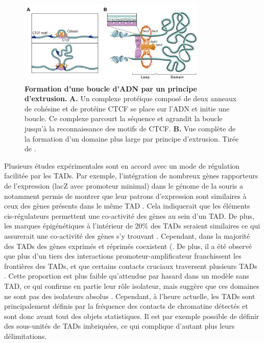 \begin{figure}[H]
    \centering
    \includegraphics[width=0.8\textwidth, page=1] {figures/introduction/fig13.png}
    \caption[Formation d'une boucle d'\acrshort{ADN} par un principe d'extrusion.]{
    \textbf{Formation d'une boucle d'\acrshort{ADN} par un principe d'extrusion.}
    \textbf{A.} Un complexe protéique composé de deux anneaux de cohésine et de protéine CTCF se place sur l'ADN et initie une boucle. Ce complexe parcourt la séquence et agrandit la boucle jusqu'à la reconnaissance des motifs de CTCF. \textbf{B.} Vue complète de la formation d'un domaine plus large par principe d'extrusion. Tirée de \citep{sanborn_chromatin_2015}.\\
    }
    \label{fig:Fig13}
\end{figure}

Plusieurs études expérimentales sont en accord avec un mode de régulation facilitée par les \acrshort{TAD}s. Par exemple, l’intégration de nombreux gènes rapporteurs de l’expression (lacZ avec promoteur minimal) dans le génome de la souris a notamment permis de montrer que leur patrons d’expression sont similaires à ceux des gènes présents dans le même \acrshort{TAD} \citep{symmons_functional_2014}. Cela indiquerait que les éléments \gls{cis}-régulateurs permettent une co-activité des gènes au sein d’un \acrshort{TAD}. De plus, les marques épigénétiques à l’intérieur de 20\% des \acrshort{TAD}s seraient similaires ce qui assurerait une co-activité des gènes s’y trouvant \citep{le_dily_distinct_2014}. Cependant, dans la majorité des \acrshort{TAD}s des gènes exprimés et réprimés coexistent (\citep{le_dily_distinct_2014}. De plus, il a été observé que plus d’un tiers des interactions promoteur-\gls{amplificateur} franchissent les frontières des \acrshort{TAD}s, et que certains contacts cruciaux traversent plusieurs \acrshort{TAD}s \citep{javierre_lineage-specific_2016}. Cette proportion est plus faible qu’attendue par hasard dans un modèle sans \acrshort{TAD}, ce qui confirme en partie leur rôle isolateur, mais suggère que ces domaines ne sont pas des isolateurs absolus \citep{schoenfelder_long-range_2019}. Cependant, à l’heure actuelle, les \acrshort{TAD}s sont principalement définis par la fréquence des contacts de chromatine détectés et sont donc avant tout des objets statistiques. Il est par exemple possible de définir des sous-unités de \acrshort{TAD}s imbriquées, ce qui complique d’autant plus leurs délimitations.

